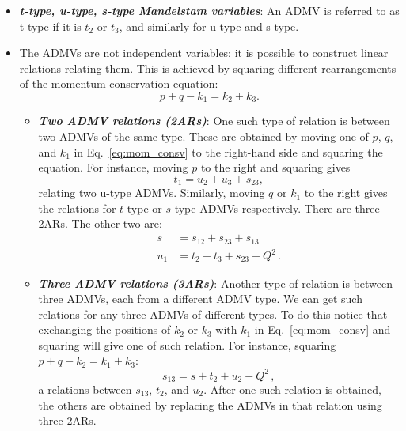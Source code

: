 \documentclass[prd,preprintnumbers,nofootinbib,superscriptaddress,onecolumn,preprint]{revtex4-1}
\newcommand\3[1]{\boldsymbol{#1}}
\begin{document}
\begin{itemize}
\item \textbf{\emph{t-type, u-type, s-type Mandelstam variables}}: An ADMV is
      referred to as t-type if it is $t_2$ or $t_3$, and similarly for
      u-type and s-type.
\item The ADMVs are not independent variables; it is possible to construct
      linear relations relating them. This is achieved by squaring different
      rearrangements of the momentum conservation equation:
      \begin{equation} 
      p+q-k_1=k_2+k_3.
      \label{eq:mom_consv}
      \end{equation}
      \begin{itemize}
      \item[] \textbf{\emph{Two ADMV relations (2ARs)}}: One such type of  relation is
            between two ADMVs of the same type. These are obtained by moving one
            of $p$, $q$, and $k_1$ in Eq.~\eqref{eq:mom_consv} to the right-hand
            side and squaring the equation. For instance, moving $p$ to the right
            and squaring gives
            \begin{equation}
            t_1=u_2+u_3+s_{23}, \label{e.mrel1}
            \end{equation}
            relating two u-type ADMVs. Similarly, moving $q$ or $k_1$ to the right
            gives the relations for $t$-type or $s$-type ADMVs respectively. There
            are three 2ARs. The other two are:
            \begin{align}
            s &{}= s_{12} + s_{23} + s_{13} \\
            u_1 &{}= t_2 + t_3 + s_{23} + Q^2 \, . \label{e.u1id}
            \end{align}
      \item[] \textbf{\emph{Three ADMV relations (3ARs)}}: Another type of relation is between
            three ADMVs, each from a different ADMV type. We can get such
            relations for any three ADMVs of different types. To do this notice
            that exchanging the positions of $k_2$ or $k_3$ with $k_1$ in
            Eq.~\eqref{eq:mom_consv} and squaring will give one of such relation.
            For instance, squaring $p+q-k_2=k_1+k_3$:
            \begin{equation} 
            s_{13}=s+t_2+u_2+Q^2 \, , \label{e.3arex}
            \end{equation} 
            a relations between $s_{13}$, $t_2$, and $u_2$. After one
            such relation is obtained, the others are obtained by replacing
            the ADMVs in that relation using three 2ARs.
      \end{itemize}
\end{itemize}
\end{document}
